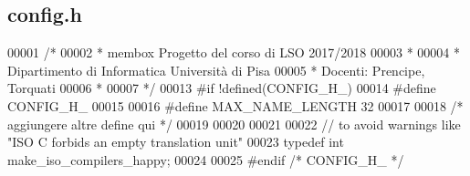 \hypertarget{config_8h_source}{}\subsection{config.\+h}

\begin{DoxyCode}
00001 \textcolor{comment}{/*}
00002 \textcolor{comment}{ * membox Progetto del corso di LSO 2017/2018}
00003 \textcolor{comment}{ *}
00004 \textcolor{comment}{ * Dipartimento di Informatica Università di Pisa}
00005 \textcolor{comment}{ * Docenti: Prencipe, Torquati}
00006 \textcolor{comment}{ * }
00007 \textcolor{comment}{ */}
00013 \textcolor{preprocessor}{#if !defined(CONFIG\_H\_)}
00014 \textcolor{preprocessor}{#define CONFIG\_H\_}
00015 
00016 \textcolor{preprocessor}{#define MAX\_NAME\_LENGTH                  32}
00017 
00018 \textcolor{comment}{/* aggiungere altre define qui */}
00019 
00020 
00021 
00022 \textcolor{comment}{// to avoid warnings like "ISO C forbids an empty translation unit"}
00023 \textcolor{keyword}{typedef} \textcolor{keywordtype}{int} make\_iso\_compilers\_happy;
00024 
00025 \textcolor{preprocessor}{#endif }\textcolor{comment}{/* CONFIG\_H\_ */}\textcolor{preprocessor}{}
\end{DoxyCode}
